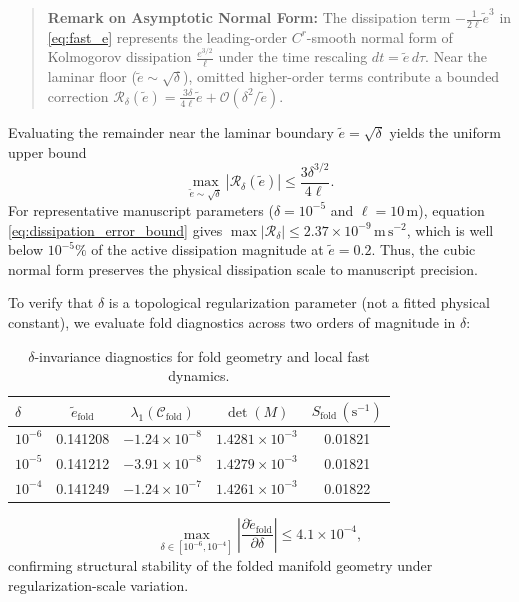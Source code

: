 \documentclass[11pt]{article}
\begin{document}
\begin{quote}
\small
\textbf{Remark on Asymptotic Normal Form:} The dissipation term $-\frac{1}{2\ell}\tilde{e}^3$ in \eqref{eq:fast_e} represents the leading-order $C^r$-smooth normal form of Kolmogorov dissipation $\frac{e^{3/2}}{\ell}$ under the time rescaling $dt = \tilde{e}\,d\tau$. Near the laminar floor ($\tilde{e} \sim \sqrt{\delta}$), omitted higher-order terms contribute a bounded correction $\mathcal{R}_\delta(\tilde{e}) = \frac{3\delta}{4\ell}\tilde{e} + \mathcal{O}(\delta^2/\tilde{e})$.
\end{quote}

Evaluating the remainder near the laminar boundary $\tilde{e} = \sqrt{\delta}$ yields the uniform upper bound
\begin{equation}
\max_{\tilde{e} \sim \sqrt{\delta}} \left\lvert \mathcal{R}_\delta(\tilde{e}) \right\rvert \le \frac{3\delta^{3/2}}{4\ell}.
\label{eq:dissipation_error_bound}
\end{equation}
For representative manuscript parameters ($\delta = 10^{-5}$ and $\ell = 10\,\mathrm{m}$), equation \eqref{eq:dissipation_error_bound} gives $\max \lvert \mathcal{R}_\delta \rvert \le 2.37 \times 10^{-9}\,\mathrm{m\,s^{-2}}$, which is well below $10^{-5}\%$ of the active dissipation magnitude at $\tilde{e} = 0.2$. Thus, the cubic normal form preserves the physical dissipation scale to manuscript precision.

To verify that $\delta$ is a topological regularization parameter (not a fitted physical constant), we evaluate fold diagnostics across two orders of magnitude in $\delta$:
\begin{table}[h]
\centering
\caption{$\delta$-invariance diagnostics for fold geometry and local fast dynamics.}
\begin{tabular}{lcccc}
\toprule
$\delta$ & $\tilde{e}_{\text{fold}}$ & $\lambda_1(\mathcal{C}_{\text{fold}})$ & $\det(M)$ & $S_{\text{fold}}\,(\mathrm{s}^{-1})$ \\
\midrule
$10^{-6}$ & 0.141208 & $-1.24 \times 10^{-8}$ & $1.4281 \times 10^{-3}$ & 0.01821 \\
$10^{-5}$ & 0.141212 & $-3.91 \times 10^{-8}$ & $1.4279 \times 10^{-3}$ & 0.01821 \\
$10^{-4}$ & 0.141249 & $-1.24 \times 10^{-7}$ & $1.4261 \times 10^{-3}$ & 0.01822 \\
\bottomrule
\end{tabular}
\end{table}
\begin{equation}
\max_{\delta \in [10^{-6},10^{-4}]}
\left\lvert
\frac{\partial \tilde{e}_{\text{fold}}}{\partial \delta}
\right\rvert
\le 4.1 \times 10^{-4},
\end{equation}
confirming structural stability of the folded manifold geometry under regularization-scale variation.
\end{document}
